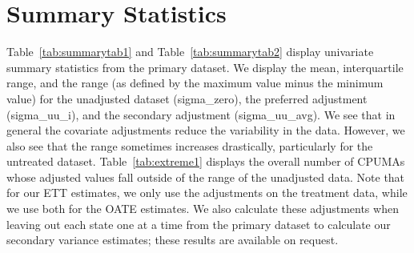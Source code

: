 
\section{Summary Statistics}
\label{sec:appendixsumstat}

Table~\ref{tab:summarytab1} and Table~\ref{tab:summarytab2} display univariate summary statistics from the primary dataset. We display the mean, interquartile range, and the range (as defined by the maximum value minus the minimum value) for the unadjusted dataset (sigma\_zero), the preferred adjustment (sigma\_uu\_i), and the secondary adjustment (sigma\_uu\_avg). We see that in general the covariate adjustments reduce the variability in the data. However, we also see that the range sometimes increases drastically, particularly for the untreated dataset. Table~\ref{tab:extreme1} displays the overall number of CPUMAs whose adjusted values fall outside of the range of the unadjusted data. Note that for our ETT estimates, we only use the adjustments on the treatment data, while we use both for the OATE estimates. 
We also calculate these adjustments when leaving out each state one at a time from the primary dataset to calculate our secondary variance estimates; these results are available on request. 

